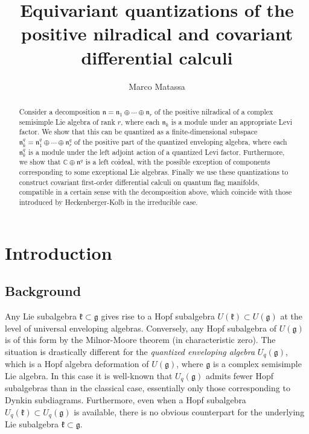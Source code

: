 \documentclass[a4paper, 12pt, reqno, english]{amsart}
\numberwithin{equation}{section}
\numberwithin{figure}{section}
\theoremstyle{plain}
\theoremstyle{plain}
\theoremstyle{plain}
\theoremstyle{plain}
\theoremstyle{plain}
\theoremstyle{definition}
\theoremstyle{definition}
\theoremstyle{definition}
\theoremstyle{remark}
\theoremstyle{definition}
\theoremstyle{definition}
\newcommand{\Uqg}{U_q(\mathfrak{g})}
\newcommand{\Uqk}{U_q(\mathfrak{k})}
\newcommand{\bbC}{\mathbb{C}}
\newcommand{\lieg}{\mathfrak{g}}
\newcommand{\liek}{\mathfrak{k}}
\newcommand{\lien}{\mathfrak{n}}
\newcommand{\qnil}{\lien^q}
\begin{document}
\title[Equivariant quantizations and covariant differential calculi]{Equivariant quantizations of the positive nilradical and covariant differential calculi}

\author{Marco Matassa}

\address{OsloMet – Oslo Metropolitan University}


\begin{abstract}
Consider a decomposition $\lien = \lien_1 \oplus \cdots \oplus \lien_r$ of the positive nilradical of a complex semisimple Lie algebra of rank $r$, where each $\lien_k$ is a module under an appropriate Levi factor.
We show that this can be quantized as a finite-dimensional subspace $\qnil_k = \qnil_1 \oplus \cdots \oplus \qnil_r$ of the positive part of the quantized enveloping algebra, where each $\qnil_k$ is a module under the left adjoint action of a quantized Levi factor.
Furthermore, we show that $\bbC \oplus \qnil$ is a left coideal, with the possible exception of components corresponding to some exceptional Lie algebras.
Finally we use these quantizations to construct covariant first-order differential calculi on quantum flag manifolds, compatible in a certain sense with the decomposition above, which coincide with those introduced by Heckenberger-Kolb in the irreducible case.
\end{abstract}

\maketitle

\section{Introduction}

\subsection{Background}

Any Lie subalgebra $\liek \subset \lieg$ gives rise to a Hopf subalgebra $U(\liek) \subset U(\lieg)$ at the level of universal enveloping algebras. Conversely, any Hopf subalgebra of $U(\lieg)$ is of this form by the Milnor-Moore theorem (in characteristic zero).
The situation is drastically different for the \emph{quantized enveloping algebra} $\Uqg$, which is a Hopf algebra deformation of $U(\lieg)$, where $\lieg$ is a complex semisimple Lie algebra.
In this case it is well-known that $\Uqg$ admits fewer Hopf subalgebras than in the classical case, essentially only those corresponding to Dynkin subdiagrams.
Furthermore, even when a Hopf subalgebra $\Uqk \subset \Uqg$ is available, there is no obvious counterpart for the underlying Lie subalgebra $\liek \subset \lieg$.
\end{document}
